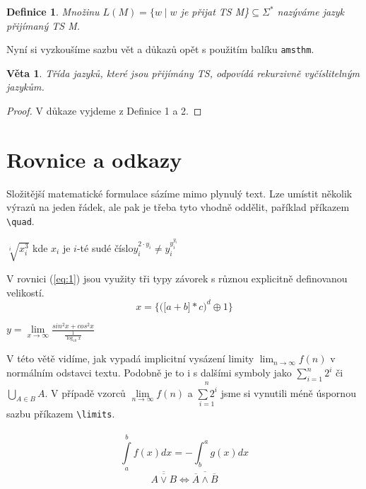 \documentclass[11pt,a4paper]{article}
\newtheorem{definition}{Definice}
\newtheorem{sentence}{Věta}
\begin{document}
\begin{twocolumn}
\begin{definition}
Množinu $L(M) = \{ w \mid w$ je přijat TS M\}$\subseteq \Sigma^*$ nazýváme {\normalfont jazyk přijímaný TS} M.
\end{definition}

Nyní si vyzkoušíme sazbu vět a důkazů opět s použitím balíku \verb|amsthm|.

\begin{sentence}
Třída jazyků, které jsou přijímány TS, odpovídá {\normalfont rekurzivně vyčíslitelným jazykům}.
\end{sentence}
\begin{proof}
V důkaze vyjdeme z Definice 1 a 2.
\end{proof}

\section{Rovnice a odkazy}
Složitější matematické formulace sázíme mimo plynulý text. Lze umístit několik výrazů na jeden řádek, ale pak je třeba tyto vhodně oddělit, paříklad příkazem \verb|\quad|.
\newline
\begin{center}
${\sqrt[i]{x^3_i}}$ \quad kde $x_i$ je $i$-té sudé číslo\quad $y^{2\cdot y_i}_i \neq y^{y^{y_i}_i}_i$
\end{center}

V rovnici (\ref{eq:1}) jsou využity tři typy závorek s různou explicitně definovanou velikostí.
\begin{equation}\label{eq:1}
x = \bigg\{ \Big( \big[a+b] \ast c \Big)^d \oplus 1 \bigg\} 
\end{equation}
\begin{center}
$y = \lim\limits_{x \to \infty} \frac{sin^2 x + cos^2 x}{\frac{1}{\log_{10} x}}$
\end{center}

V této větě vidíme, jak vypadá implicitní vysázení li\-mity $\lim_{n \to \infty} f(n)$ v normálním odstavci textu. Podobně je to i s dalšími symboly jako $\sum^n_{i=1} 2^i$ či $\bigcup_{A\in B} A$. V případě vzorců $\lim\limits_{n \to \infty} f(n)$ a $\underset{i=1}{\overset{n}{\sum 2^i}}$ jsme si vynutili méně úspornou sazbu příkazem \verb|\limits|. \\ \\
\begin{equation}
\underset{a}{\overset{b}{\int}} f(x) dx = - \int_{b}^{a} g(x) dx
\end{equation}
\begin{equation}
\overline{\overline{A \vee B}} \Leftrightarrow \overline{\overline{A} \wedge \overline{B}}
\end{equation}


\end{twocolumn}
\end{document}
